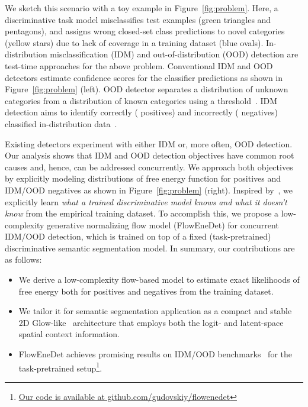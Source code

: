 \documentclass[accepted, startpage]{uai2023}
\begin{document}
We sketch this scenario with a toy example in Figure~\ref{fig:problem}. Here, a discriminative task model  misclassifies test examples (green triangles and pentagons), and assigns wrong closed-set class predictions to novel categories (yellow stars) due to lack of coverage in a training dataset (blue ovals). In-distribution misclassification (IDM) and out-of-distribution (OOD) detection are test-time approaches for the above problem. Conventional IDM and OOD detectors estimate confidence scores for the classifier predictions as shown in Figure~\ref{fig:problem} (left). OOD detector separates a distribution of unknown categories  from a distribution of known categories  using a threshold~\citep{morteza2022provable}. IDM detection aims to identify correctly ( positives) and incorrectly ( negatives) classified in-distribution data~\citep{ramalho2020density}.

Existing detectors experiment with either IDM or, more often, OOD detection. Our analysis shows that IDM and OOD detection objectives have common root causes and, hence, can be addressed concurrently. We approach both objectives by explicitly modeling distributions of free energy function for positives and IDM/OOD negatives as shown in Figure~\ref{fig:problem} (right). Inspired by~\citet{djurisic2023extremely}, we explicitly learn \textit{what a trained discriminative model knows and what it doesn't know} from the empirical training dataset. To accomplish this, we propose a low-complexity generative normalizing flow model (FlowEneDet) for concurrent IDM/OOD detection, which is trained on top of a fixed (task-pretrained) discriminative semantic segmentation model. In summary, our contributions are as follows:
\begin{itemize}
\item We derive a low-complexity flow-based model to estimate exact likelihoods of free energy both for positives and negatives from the training dataset.
	\item We tailor it for semantic segmentation application as a compact and stable 2D Glow-like~\citep{NEURIPS2018_d139db6a} architecture that employs both the logit- and latent-space spatial context information.
\item FlowEneDet achieves promising results on IDM/OOD benchmarks~\citep{michaelis2020benchmarking, fishyscapes, segmentmeifyoucan} for the  task-pretrained setup\footnote{\href{https://github.com/gudovskiy/flowenedet}{Our code is available at github.com/gudovskiy/flowenedet}}.
\end{itemize}
\end{document}
